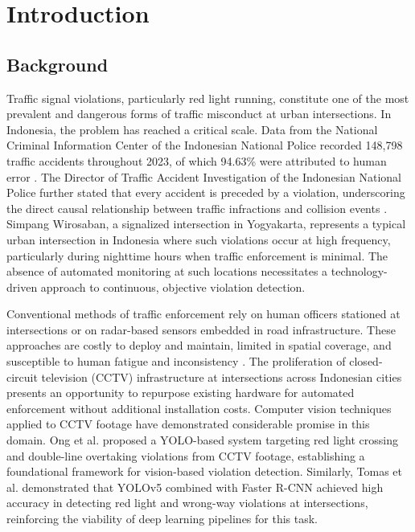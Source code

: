 \section{Introduction}

\subsection{Background}

Traffic signal violations, particularly red light running, constitute one of the most prevalent and dangerous forms of traffic misconduct at urban intersections. \cite{who2023} In Indonesia, the problem has reached a critical scale. Data from the National Criminal Information Center of the Indonesian National Police recorded 148,798 traffic accidents throughout 2023, of which 94.63\% were attributed to human error \cite{pusiknas2024}. The Director of Traffic Accident Investigation of the Indonesian National Police further stated that every accident is preceded by a violation, underscoring the direct causal relationship between traffic infractions and collision events \cite{pusiknas2024}. Simpang Wirosaban, a signalized intersection in Yogyakarta, represents a typical urban intersection in Indonesia where such violations occur at high frequency, particularly during nighttime hours when traffic enforcement is minimal. The absence of automated monitoring at such locations necessitates a technology-driven approach to continuous, objective violation detection.

Conventional methods of traffic enforcement rely on human officers stationed at intersections or on radar-based sensors embedded in road infrastructure. These approaches are costly to deploy and maintain, limited in spatial coverage, and susceptible to human fatigue and inconsistency \cite{ong2024}. The proliferation of closed-circuit television (CCTV) infrastructure at intersections across Indonesian cities presents an opportunity to repurpose existing hardware for automated enforcement without additional installation costs. Computer vision techniques applied to CCTV footage have demonstrated considerable promise in this domain. Ong et al. \cite{ong2024} proposed a YOLO-based system targeting red light crossing and double-line overtaking violations from CCTV footage, establishing a foundational framework for vision-based violation detection. Similarly, Tomas et al. \cite{tomas2024} demonstrated that YOLOv5 combined with Faster R-CNN achieved high accuracy in detecting red light and wrong-way violations at intersections, reinforcing the viability of deep learning pipelines for this task.


